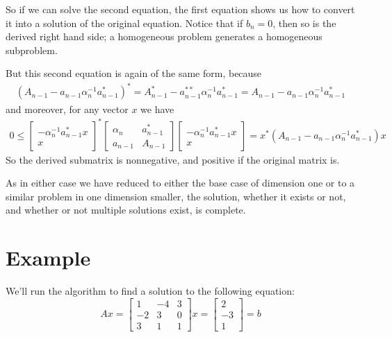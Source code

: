 \documentclass{article}
\newcommand{\bmat}[1]{\begin{bmatrix}#1\end{bmatrix}}
\begin{document}
  
So if we can solve the second equation, the first equation shows us how to convert it into a solution
of the original equation. Notice that if 
$b_n =0 $, then so is the derived right hand side; a homogeneous problem generates
a homogeneous subproblem.

But this second equation is again of the same form, because
\begin{gather}{}(A_{n-1} - a_{n-1}\alpha_n^{-1}a_{n-1}^*)^* = 
A_{n-1}^{*} - a_{n-1}^{**}\alpha_n^{-1}a_{n-1}^* = 
A_{n-1} - a_{n-1}\alpha_n^{-1}a_{n-1}^* 
\end{gather}
and moreover, for any vector $x$ we have
\begin{gather}{}
0 \leq \bmat{-\alpha_n^{-1}a_{n-1}^*x\\x}^*\bmat{\alpha_n & a_{n-1}^* \\ a_{n-1} & A_{n-1}}\bmat{-\alpha_n^{-1}a_{n-1}^*x\\x}
= 
x^*(A_{n-1} - a_{n-1}\alpha_n^{-1}a_{n-1}^*)x
\end{gather} So the derived submatrix is nonnegative, and positive if the original matrix is.

As in either case we have reduced to either the base case of dimension one or to a similar problem in one dimension smaller, the solution, whether it exists or
not, and whether or not multiple solutions exist, is complete.
\newpage  
\section{Example}

We'll run the algorithm to find a solution to the following equation:
$$ Ax = \bmat{1 & -4 & 3\\-2 & 3 & 0\\3 & 1 & 1}x = \bmat{ 2\\ -3 \\ 1 } = b $$
\end{document}

